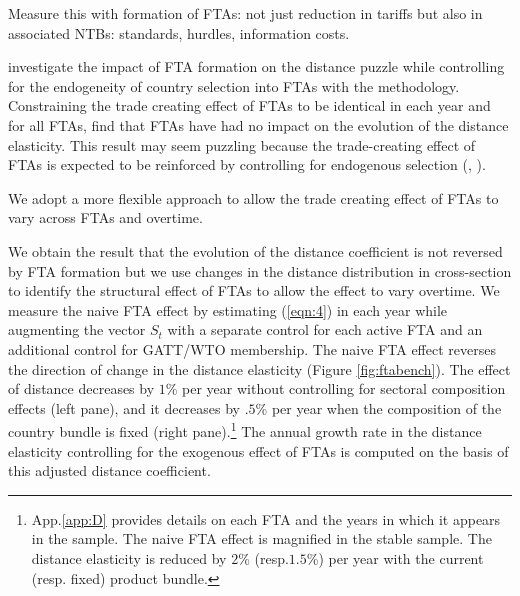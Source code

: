\documentclass[12pt,twoside,a4paper,notitlepage]{article}
\begin{document}
Measure this with formation of FTAs: not just reduction in tariffs but also in associated NTBs: standards, hurdles, information costs.


\cite{Bosquet2015} investigate the impact of FTA formation on the distance puzzle while controlling for the endogeneity of country selection into FTAs with the \cite{Baier2007} methodology.
Constraining the trade creating effect of FTAs to be identical in each year and for all FTAs, \cite{Bosquet2015} find that FTAs have had no impact on the evolution of the distance elasticity.
This result may seem puzzling because the trade-creating effect of FTAs is expected to be reinforced by controlling for endogenous selection (\cite{Baier2007}, \cite{Egger2011}).


We adopt a more flexible approach to allow the trade creating effect of FTAs to vary across FTAs and overtime.

We obtain the result that the evolution of the distance coefficient is not reversed by FTA formation but we use changes in the distance distribution in cross-section to identify the structural effect of FTAs to allow the effect to vary overtime.
We measure the naive FTA effect by estimating (\ref{eqn:4}) in each year while augmenting the vector $S_t$ with a separate control for each active FTA and an additional control for GATT/WTO membership.
The naive FTA effect reverses the direction of change in the distance elasticity (Figure \ref{fig:ftabench}).
The effect of distance decreases by $1$\% per year without controlling for sectoral composition effects (left pane), and it decreases by $.5$\% per year when the composition of the country bundle is fixed (right pane).\footnote{App.\ref{app:D} provides details on each FTA and the years in which it appears in the sample.
The naive FTA effect is magnified in the stable sample.
The distance elasticity is reduced by $2$\% (resp.$1.5$\%) per year with the current (resp.
fixed) product bundle.}
The annual growth rate in the distance elasticity controlling for the exogenous effect of FTAs is computed on the basis of this adjusted distance coefficient.
\end{document}
